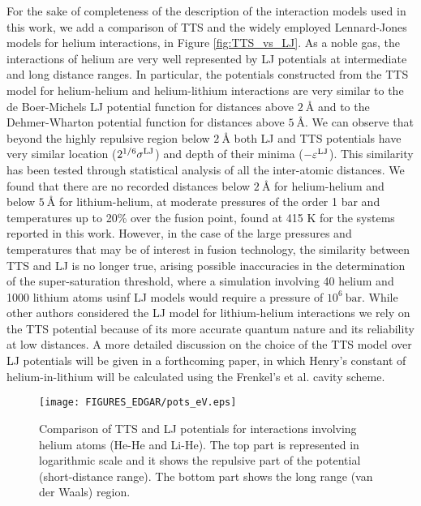 \documentclass[jcp,amsmath,amssymb,preprint]{revtex4-1}
\begin{document}
For the sake of completeness of the description of the interaction models used in this work, we add a comparison 
of TTS and the widely employed Lennard-Jones models for helium interactions, in Figure \ref{fig:TTS_vs_LJ}.  As a 
noble gas, the interactions of helium are very well represented by LJ potentials at intermediate and long distance 
ranges.  In particular, the potentials constructed from the TTS model for helium-helium and helium-lithium 
interactions are very similar to the de Boer-Michels LJ potential function\cite{de1938contribution,aziz1987new} for distances above $\SI{2}{\angstrom}$ and to the Dehmer-Wharton potential function \cite{dehmer1972absolute} for distances above 
$\SI{5}{\angstrom}$. We can observe that beyond the highly repulsive region below $\SI{2}{\angstrom}$ both LJ and TTS potentials have very similar location ($2^{1/6}\sigma^{\rm LJ}$) and depth of their minima ($-\varepsilon^{\rm LJ}$). This similarity has been tested through statistical analysis of all the inter-atomic distances. We found that there are no recorded distances below $\SI{2}{\angstrom}$ for helium-helium and below $\SI{5}{\angstrom}$ for lithium-helium, at moderate pressures of the order 1 bar and temperatures up to 20\% over the fusion point, found at 415 K for the systems reported in this work. However, in the case of the large pressures and temperatures that may be of interest in fusion technology, the similarity between TTS and LJ is no longer true,  arising possible inaccuracies in the determination of the super-saturation threshold, where a simulation involving 40 helium and 1000 lithium atoms usinf LJ models would require a pressure of $10^6\SI{}{\bar}$\cite{marti2022nucleation}.  While other authors considered the LJ model for lithium-helium interactions\cite{fraile2020volume} we rely on the TTS potential because of its more accurate quantum nature and its reliability at low distances.  A more 
detailed discussion on the choice of the TTS model over LJ potentials will be given in a forthcoming paper, in which 
Henry's constant of helium-in-lithium will be calculated using the Frenkel's et al.  cavity scheme\cite{li2017computational,li2018computational,wand2018addressing,espinosa2018calculation}.
        
\begin{figure}[htbp]
      \begin{center}
                \centering
                \texttt{[image: FIGURES\_EDGAR/pots\_eV.eps]}
                \caption{Comparison of TTS and LJ potentials for interactions involving helium atoms (He-He and Li-He). The top part is represented in logarithmic scale and it shows the repulsive part of the potential (short-distance range). The bottom part shows the long range (van der Waals) region.}
                \label{fig:TTS_vs_LJ}
        \end{center}        
      \label{fig:TTS_HeHe}
\end{figure}
        
\end{document}
